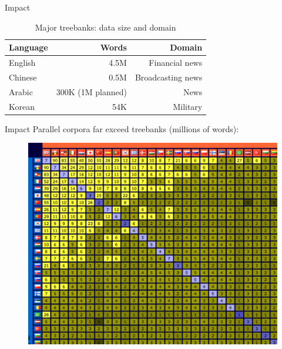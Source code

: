 \documentclass{beamer}
\begin{document}
\begin{frame}[t]{Impact}
\vspace{0.5in}
\begin{table}
  \begin{tabular}{l|rr}
    \hline
    Language & Words &  Domain \\ \hline
    English & 4.5M& Financial news \\
    Chinese & 0.5M & Broadcasting news \\ 
    Arabic &  300K (1M planned)  &  News  \\
    Korean & 54K  & Military \\ \hline
  \end{tabular}
\caption{Major treebanks: data size and domain \label{table_treebanks_size}}
\end{table}
\end{frame}


\begin{frame}[t]{Impact}
Parallel corpora far exceed treebanks (millions of words):
  \begin{figure}
    {\centering \includegraphics[scale=0.7]{resource_matrix.pdf}}
  \end{figure}
\end{frame}
\end{document}
